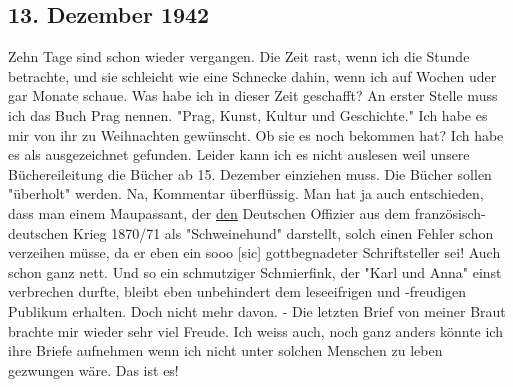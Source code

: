 \subsection{13. Dezember 1942}

Zehn Tage sind schon wieder vergangen.
Die Zeit rast, wenn ich die Stunde betrachte, und sie schleicht wie eine Schnecke dahin, wenn ich auf Wochen uder gar Monate schaue.
Was habe ich in dieser Zeit geschafft?
An erster Stelle muss ich das Buch Prag nennen.
"Prag, Kunst, Kultur und Geschichte."
Ich habe es mir von ihr zu Weihnachten gew\"{u}nscht.
Ob sie es noch bekommen hat?
Ich habe es als ausgezeichnet gefunden.
Leider kann ich es nicht auslesen weil unsere B\"{u}chereileitung die B\"{u}cher ab 15. Dezember einziehen muss.
Die B\"{u}cher sollen "\"{u}berholt" werden.
Na, Kommentar \"{u}berfl\"{u}ssig.
Man hat ja auch entschieden, dass man einem Maupassant, der \ul{den} Deutschen Offizier aus dem franz\"{o}sisch-deutschen Krieg 1870/71 als "Schweinehund" darstellt, solch einen Fehler schon verzeihen m\"{u}sse, da er eben ein sooo{\color{red} [sic] } gottbegnadeter Schriftsteller sei!
Auch schon ganz nett.
Und so ein schmutziger Schmierfink, der "Karl und Anna" einst verbrechen durfte, bleibt eben unbehindert dem leseeifrigen und -freudigen Publikum erhalten.
Doch nicht mehr davon.
- Die letzten Brief von meiner Braut brachte mir wieder sehr viel Freude.
Ich weiss auch, noch ganz anders k\"{o}nnte ich ihre Briefe aufnehmen wenn ich nicht unter solchen Menschen zu leben gezwungen w\"{a}re.
Das ist es!

\clearpage
